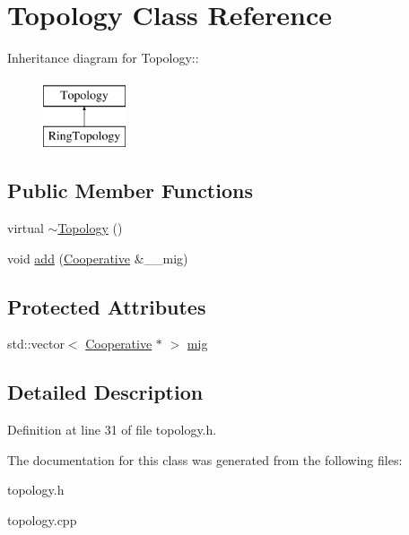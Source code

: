 \hypertarget{classTopology}{
\section{Topology Class Reference}
\label{classTopology}
}
Inheritance diagram for Topology::\begin{figure}[H]
\begin{center}
\leavevmode
\includegraphics[height=2cm]{classTopology}
\end{center}
\end{figure}
\subsection*{Public Member Functions}
\begin{CompactItemize}
\item 
\hypertarget{classTopology_3e447669757c8311c7f6f8edc705abf2}{
virtual \hyperlink{classTopology_3e447669757c8311c7f6f8edc705abf2}{$\sim$Topology} ()}
\label{classTopology_3e447669757c8311c7f6f8edc705abf2}

\item 
\hypertarget{classTopology_62bc46d8c20fdc71dad9e7c7a0d7aded}{
void \hyperlink{classTopology_62bc46d8c20fdc71dad9e7c7a0d7aded}{add} (\hyperlink{classCooperative}{Cooperative} \&\_\-\_\-mig)}
\label{classTopology_62bc46d8c20fdc71dad9e7c7a0d7aded}

\end{CompactItemize}
\subsection*{Protected Attributes}
\begin{CompactItemize}
\item 
\hypertarget{classTopology_247a2faa8568b678f0b7b11e62c7812c}{
std::vector$<$ \hyperlink{classCooperative}{Cooperative} $\ast$ $>$ \hyperlink{classTopology_247a2faa8568b678f0b7b11e62c7812c}{mig}}
\label{classTopology_247a2faa8568b678f0b7b11e62c7812c}

\end{CompactItemize}


\subsection{Detailed Description}




Definition at line 31 of file topology.h.

The documentation for this class was generated from the following files:\begin{CompactItemize}
\item 
topology.h\item 
topology.cpp\end{CompactItemize}
